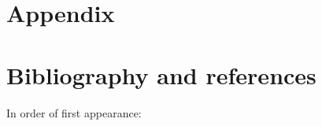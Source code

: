 \documentclass[11pt,a4paper]{article}
\begin{document}
	
	
	
	
	
	
	\appendix	
	
	
	
	\newpage
	\section{Appendix}
	
	
	
	\newpage
	\section{Bibliography and references}
	In order of first appearance:
	\printbibliography[heading=none]
	
	\newpage
	
\end{document}
